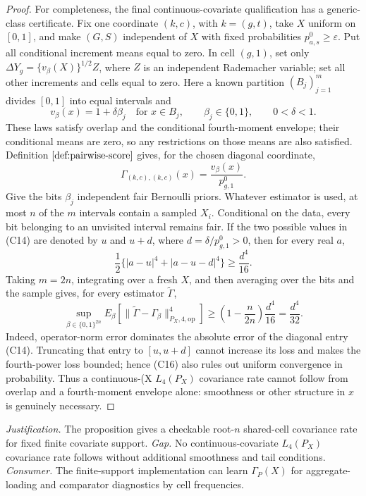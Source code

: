 \documentclass{article}
\begin{document}
\begin{proof}
For completeness, the final continuous-covariate qualification has a generic-class certificate.  Fix one coordinate \((k,c)\), with \(k=(g,t)\), take \(X\) uniform on \([0,1]\), and make \((G,S)\) independent of \(X\) with fixed probabilities \(p^0_{a,s}\ge\varepsilon\).  Put all conditional increment means equal to zero.  In cell \((g,1)\), set only \(\Delta Y_g=\{v_\beta(X)\}^{1/2}Z\), where \(Z\) is an independent Rademacher variable; set all other increments and cells equal to zero.  Here a known partition \((B_j)_{j=1}^{m}\) divides \([0,1]\) into equal intervals and
\[
 v_\beta(x)=1+\delta\beta_j\quad\text{for }x\in B_j,
 \qquad \beta_j\in\{0,1\},\qquad 0<\delta<1.
 \tag{C13}
\]
These laws satisfy overlap and the conditional fourth-moment envelope; their conditional means are zero, so any restrictions on those means are also satisfied.  Definition \(\ref{def:pairwise-score}\) gives, for the chosen diagonal coordinate,
\[
 \Gamma_{(k,c),(k,c)}(x)=\frac{v_\beta(x)}{p^0_{g,1}}.
 \tag{C14}
\]
Give the bits \(\beta_j\) independent fair Bernoulli priors.  Whatever estimator is used, at most \(n\) of the \(m\) intervals contain a sampled \(X_i\).  Conditional on the data, every bit belonging to an unvisited interval remains fair.  If the two possible values in (C14) are denoted by \(u\) and \(u+d\), where \(d=\delta/p^0_{g,1}>0\), then for every real \(a\),
\[
 \frac12\{|a-u|^4+|a-u-d|^4\}\ge\frac{d^4}{16}.
 \tag{C15}
\]
Taking \(m=2n\), integrating over a fresh \(X\), and then averaging over the bits and the sample gives, for every estimator \(\widetilde\Gamma\),
\[
 \sup_{\beta\in\{0,1\}^{2n}}
 E_\beta\!\left[
 \|\widetilde\Gamma-\Gamma_\beta\|_{P_X,4,\mathrm{op}}^4
 \right]
 \ge \left(1-\frac{n}{2n}\right)\frac{d^4}{16}
 =\frac{d^4}{32}.
 \tag{C16}
\]
Indeed, operator-norm error dominates the absolute error of the diagonal entry (C14).  Truncating that entry to \([u,u+d]\) cannot increase its loss and makes the fourth-power loss bounded; hence (C16) also rules out uniform convergence in probability.  Thus a continuous-(X\) \(L_4(P_X)\) covariance rate cannot follow from overlap and a fourth-moment envelope alone: smoothness or other structure in \(x\) is genuinely necessary.
\end{proof}
\par\smallskip\noindent \textit{Justification.} The proposition gives a checkable root-\(n\) shared-cell covariance rate for fixed finite covariate support. \textit{Gap.} No continuous-covariate \(L_4(P_X)\) covariance rate follows without additional smoothness and tail conditions. \textit{Consumer.} The finite-support implementation can learn \(\Gamma_P(X)\) for aggregate-loading and comparator diagnostics by cell frequencies.
\end{document}
